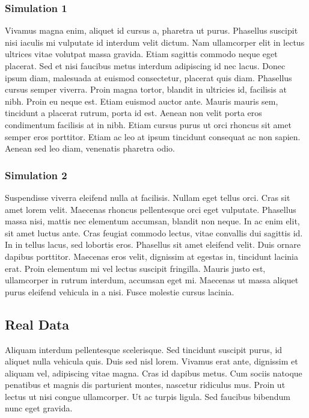 \documentclass[draft, grl]{agutex}
\begin{document}
\begin{article}
\subsubsection{Simulation 1}

Vivamus magna enim, aliquet id cursus a, pharetra ut purus. Phasellus suscipit nisi iaculis mi vulputate id interdum velit dictum. Nam ullamcorper elit in lectus ultrices vitae volutpat massa gravida. Etiam sagittis commodo neque eget placerat. Sed et nisi faucibus metus interdum adipiscing id nec lacus. Donec ipsum diam, malesuada at euismod consectetur, placerat quis diam. Phasellus cursus semper viverra. Proin magna tortor, blandit in ultricies id, facilisis at nibh. Proin eu neque est. Etiam euismod auctor ante. Mauris mauris sem, tincidunt a placerat rutrum, porta id est. Aenean non velit porta eros condimentum facilisis at in nibh. Etiam cursus purus ut orci rhoncus sit amet semper eros porttitor. Etiam ac leo at ipsum tincidunt consequat ac non sapien. Aenean sed leo diam, venenatis pharetra odio.

\subsubsection{Simulation 2}

Suspendisse viverra eleifend nulla at facilisis. Nullam eget tellus orci. Cras sit amet lorem velit. Maecenas rhoncus pellentesque orci eget vulputate. Phasellus massa nisi, mattis nec elementum accumsan, blandit non neque. In ac enim elit, sit amet luctus ante. Cras feugiat commodo lectus, vitae convallis dui sagittis id. In in tellus lacus, sed lobortis eros. Phasellus sit amet eleifend velit. Duis ornare dapibus porttitor. Maecenas eros velit, dignissim at egestas in, tincidunt lacinia erat. Proin elementum mi vel lectus suscipit fringilla. Mauris justo est, ullamcorper in rutrum interdum, accumsan eget mi. Maecenas ut massa aliquet purus eleifend vehicula in a nisi. Fusce molestie cursus lacinia.

\subsection{Real Data}

Aliquam interdum pellentesque scelerisque. Sed tincidunt suscipit purus, id aliquet nulla vehicula quis. Duis sed nisl lorem. Vivamus erat ante, dignissim et aliquam vel, adipiscing vitae magna. Cras id dapibus metus. Cum sociis natoque penatibus et magnis dis parturient montes, nascetur ridiculus mus. Proin ut lectus ut nisi congue ullamcorper. Ut ac turpis ligula. Sed faucibus bibendum nunc eget gravida.


\end{article}
\end{document}
